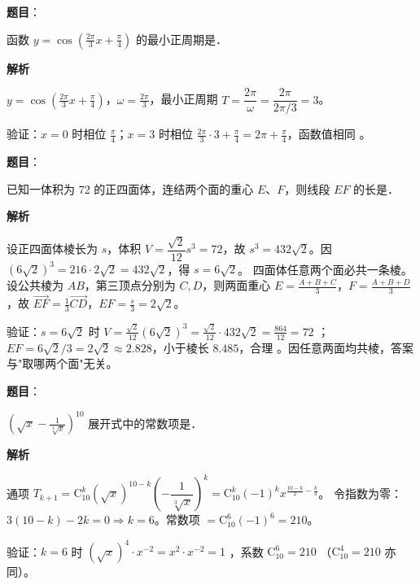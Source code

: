 \begin{answer}

\textbf{题目}：

函数 $y = \cos\left(\frac{2\pi}{3}x + \frac{\pi}{4}\right)$ 的最小正周期是\gkblank{}．

\textbf{解析}

$y=\cos\!\left(\frac{2\pi}{3}x+\frac\pi4\right)$，$\omega=\frac{2\pi}{3}$，最小正周期 $T=\dfrac{2\pi}{\omega}=\dfrac{2\pi}{2\pi/3}=3$。

验证：$x=0$ 时相位 $\frac\pi4$；$x=3$ 时相位 $\frac{2\pi}{3}\cdot3+\frac\pi4=2\pi+\frac\pi4$，函数值相同 。


\end{answer}
\begin{answer}

\textbf{题目}：

已知一体积为 72 的正四面体，连结两个面的重心 $E$、$F$，则线段 $EF$ 的长是\gkblank{}．

\textbf{解析}

设正四面体棱长为 $s$，体积 $V=\dfrac{\sqrt2}{12}s^3=72$，故 $s^3=432\sqrt2$。因 $(6\sqrt2)^3=216\cdot2\sqrt2=432\sqrt2$，得 $s=6\sqrt2$。
四面体任意两个面必共一条棱。设公共棱为 $AB$，第三顶点分别为 $C,D$，则两面重心 $E=\frac{A+B+C}{3}$，$F=\frac{A+B+D}{3}$，故 $\overrightarrow{EF}=\frac13\overrightarrow{CD}$，$EF=\frac{s}{3}=2\sqrt2$。

验证：$s=6\sqrt2$ 时 $V=\frac{\sqrt2}{12}(6\sqrt2)^3=\frac{\sqrt2}{12}\cdot432\sqrt2=\frac{864}{12}=72$ ；$EF=6\sqrt2/3=2\sqrt2\approx2.828$，小于棱长 $8.485$，合理 。因任意两面均共棱，答案与"取哪两个面"无关。


\end{answer}
\begin{answer}

\textbf{题目}：

$\left(\sqrt{x} - \frac{1}{\sqrt[3]{x}}\right)^{10}$ 展开式中的常数项是\gkblank{}．

\textbf{解析}

通项 $T_{k+1}=\mathrm C_{10}^k(\sqrt x)^{10-k}\left(-\dfrac{1}{\sqrt[3]{x}}\right)^{k}=\mathrm C_{10}^k(-1)^k x^{\frac{10-k}{2}-\frac{k}{3}}$。
令指数为零：$3(10-k)-2k=0\Rightarrow k=6$。常数项 $=\mathrm C_{10}^6(-1)^6=210$。

验证：$k=6$ 时 $(\sqrt x)^4\cdot x^{-2}=x^2\cdot x^{-2}=1$ ，系数 $\mathrm C_{10}^6=210$ （$\mathrm C_{10}^4=210$ 亦同）。


\end{answer}
